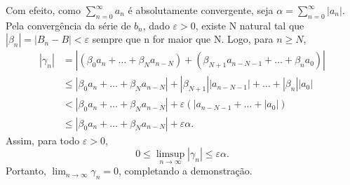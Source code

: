 \documentclass[../analysis_notes.tex]{subfiles}
\begin{document}
\begin{proof*}
	Com efeito, como \(\sum\limits_{n=0}^{\infty}a_{n}\) é absolutamente convergente, seja \(\alpha =\sum\limits_{n=0}^{\infty}|a_{n}|\). Pela convergência da série de \(b_{n}\), dado \(\varepsilon >0\), existe N natural tal que \(|\beta_{n}|=|B_{n}-B|<\varepsilon \) sempre que n for maior que N. Logo, para \(n\geq N\),
	\begin{align*}
		|\gamma_{n}| & = |(\beta_{0}a_{n}+\dotsc +\beta_{N}a_{n-N})+(\beta_{N+1}a_{n-N-1}+\dotsc +\beta_{n}a_{0})|        \\
		             & \leq |\beta_{0}a_{n}+\dotsc +\beta_{N}a_{n-N}|+|\beta_{N+1}||a_{n-N-1}|+\dotsc +|\beta_{n}||a_{0}| \\
		             & < |\beta_{0}a_{n}+\dotsc +\beta_{N}a_{n-N}|+ \varepsilon (|a_{n-N-1} +\dotsc +|a_{0}|)             \\
		             & \leq |\beta_{0}a_{n}+\dotsc +\beta_{N}a_{n-N}| +\varepsilon\alpha.
	\end{align*}
	Assim, para todo \(\varepsilon >0\),
	\[
		0\leq \limsup_{n\to \infty}|\gamma_{n}|\leq \varepsilon \alpha .
	\]
	Portanto, \(\lim_{n\to \infty}\gamma_{n}=0\), completando a demonstração. \qedsymbol
\end{proof*}
\end{document}
